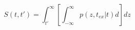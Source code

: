 \begin{equation}
S(t,t') = \int_{t'}^{\infty} \left[ \int_{-\infty}^\infty p(z,t_{ex}|t) d\right] dz
\end{equation}